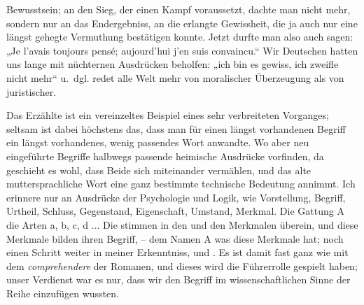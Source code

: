 {Bewusstsein; an den Sieg, der einen Kampf voraussetzt, dachte man nicht mehr, sondern nur an das Endergebniss, an die erlangte Gewissheit, die ja auch nur eine längst gehegte Vermuthung bestätigen konnte. Jetzt durfte man also auch sagen: „Je l’avais toujours pensé; aujourd’hui j’en suis convaincu.“ Wir Deutschen hatten uns lange mit nüchternen Ausdrücken beholfen: „ich bin es gewiss, ich zweifle nicht mehr“ u.~dgl.    redet alle Welt mehr von moralischer Überzeugung als von juristischer. 

Das Erzählte ist ein vereinzeltes Beispiel eines sehr verbreiteten \label{fp.259} Vorganges; seltsam ist dabei höchstens das, dass man für einen längst vorhandenen Begriff ein längst vorhandenes, wenig passendes Wort anwandte. Wo aber neu eingeführte Begriffe halbwegs passende heimische Ausdrücke vorfinden, da geschieht es wohl, dass Beide sich miteinander vermählen, und das alte muttersprachliche Wort eine ganz bestimmte technische Bedeutung annimmt. Ich erinnere nur an Ausdrücke der Psychologie und Logik, wie Vorstellung, Begriff, Urtheil, Schluss, Gegenstand, Eigenschaft, Umstand, Merkmal. Die Gattung A  die Arten a, b, c, d ... Die stimmen in den und den Merkmalen über\-\label{sp.264}ein, und diese Merkmale bilden ihren Begriff, –  dem Namen A  was diese Merkmale hat; noch einen Schritt weiter in meiner Erkenntniss, und . Es ist damit fast ganz wie mit dem \textit{comprehendere} der Romanen, und dieses wird die Führerrolle gespielt haben; unser Verdienst war es nur, dass wir den Begriff im wissenschaftlichen Sinne der Reihe einzufügen wussten.

}
